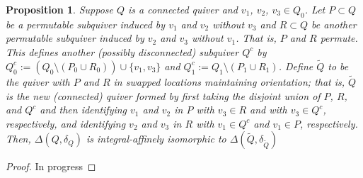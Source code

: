 \documentclass[11pt]{amsart}
\theoremstyle{plain}
\newtheorem{proposition}[theorem]{Proposition}
\theoremstyle{definition}
\begin{document}
\begin{proposition} \label{subquiver_permutation}
    Suppose $Q$ is a connected quiver and $v_1$, $v_2$, $v_3 \in Q_0$. Let $P \subset Q$ be a permutable subquiver induced by $v_1$ and $v_2$ without $v_3$ and $R \subset Q$ be another permutable subquiver induced by $v_2$ and $v_3$ without $v_1$. That is, $P$ and $R$ permute. This defines another (possibly disconnected) subquiver $Q^c$ by $Q^c_0 := (Q_0 \setminus (P_0 \cup R_0)) \cup \{v_1, v_3\}$ and $Q^c_1 := Q_1 \setminus (P_1 \cup R_1)$. Define $\widetilde{Q}$ to be the quiver with $P$ and $R$ in swapped locations maintaining orientation; that is, $\widetilde{Q}$ is the new (connected) quiver formed by first taking the disjoint union of $P$, $R$, and $Q^c$ and then identifying $v_1$ and $v_2$ in $P$ with $v_3 \in R$ and with $v_3 \in Q^c$, respectively, and identifying $v_2$ and $v_3$ in $R$ with $v_1 \in Q^c$ and $v_1 \in P$, respectively. Then, $\Delta(Q, \delta_Q)$ is integral-affinely isomorphic to $\Delta(\widetilde{Q}, \delta_{\widetilde{Q}})$
    
    
\end{proposition}


\begin{proof}
    In progress
\end{proof}
\end{document}
